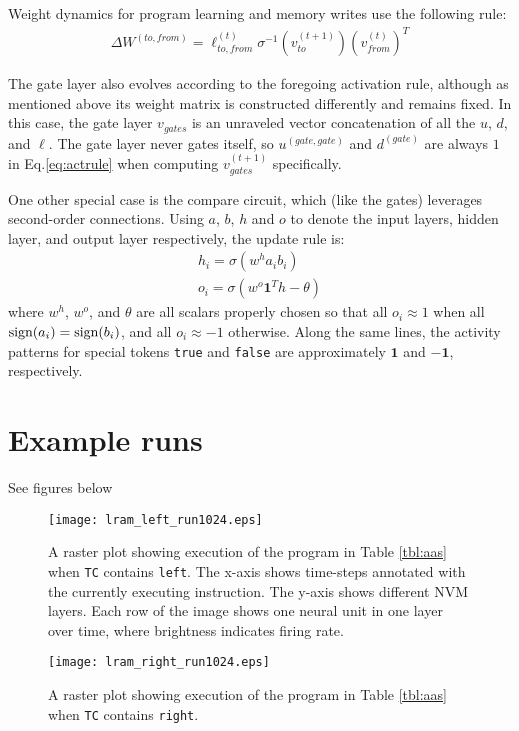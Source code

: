 \documentclass[pdftex,12pt,letterpaper]{article}
\newcommand{\sign}{\text{\upshape{sign}}}
\begin{document}
Weight dynamics for program learning and memory writes use the following rule:
\begin{align}
\Delta W^{(to,from)} = \ell^{(t)}_{to,from}\sigma^{-1}(v^{(t+1)}_{to})(v^{(t)}_{from})^T
\end{align}

The gate layer also evolves according to the foregoing activation rule, although as mentioned above its weight matrix is constructed differently and remains fixed.  In this case, the gate layer $v_{gates}$ is an unraveled vector concatenation of all the $u$, $d$, and $\ell$.  The gate layer never gates itself, so $u^{(gate,gate)}$ and $d^{(gate)}$ are always $1$ in Eq.\@ \ref{eq:actrule} when computing $v_{gates}^{(t+1)}$ specifically.

One other special case is the compare circuit, which (like the gates) leverages second-order connections.  Using $a$, $b$, $h$ and $o$ to denote the input layers, hidden layer, and output layer respectively, the update rule is:
\begin{align}
h_i = \sigma\left(w^ha_ib_i\right) \\
o_i = \sigma\left(w^o\textbf{1}^Th - \theta\right)
\end{align}
where $w^h$, $w^o$, and $\theta$ are all scalars properly chosen so that all $o_i \approx 1$ when all $\sign(a_i) = \sign(b_i)$, and all $o_i \approx -1$ otherwise.  Along the same lines, the activity patterns for special tokens \texttt{true} and \texttt{false} are approximately $\mathbf{1}$ and $-\mathbf{1}$, respectively.

\section{Example runs}

See figures below

\begin{sidewaysfigure}
\centering
\texttt{[image: lram\_left\_run1024.eps]}
\caption{A raster plot showing execution of the program in Table \ref{tbl:aas} when \texttt{TC} contains \texttt{left}.  The x-axis shows time-steps annotated with the currently executing instruction.  The y-axis shows different NVM layers.  Each row of the image shows one neural unit in one layer over time, where brightness indicates firing rate.}
\end{sidewaysfigure}

\begin{sidewaysfigure}
\centering
\texttt{[image: lram\_right\_run1024.eps]}
\caption{A raster plot showing execution of the program in Table \ref{tbl:aas} when \texttt{TC} contains \texttt{right}.}
\end{sidewaysfigure}
\end{document}
